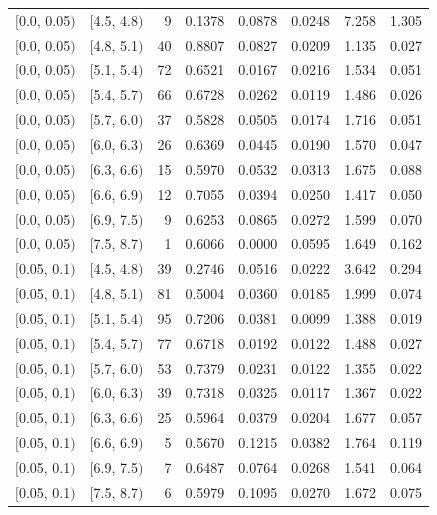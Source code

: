 \documentclass[11pt]{article}
\begin{document}
\begin{longtable}{| l | l | r | r | r | r | r | r |}
        $[$0.0, 0.05$)$ & $[$4.5, 4.8$)$ & 9 & 0.1378 & 0.0878 & 0.0248 & 7.258 & 1.305 \\
        $[$0.0, 0.05$)$ & $[$4.8, 5.1$)$ & 40 & 0.8807 & 0.0827 & 0.0209 & 1.135 & 0.027 \\
        $[$0.0, 0.05$)$ & $[$5.1, 5.4$)$ & 72 & 0.6521 & 0.0167 & 0.0216 & 1.534 & 0.051 \\
        $[$0.0, 0.05$)$ & $[$5.4, 5.7$)$ & 66 & 0.6728 & 0.0262 & 0.0119 & 1.486 & 0.026 \\
        $[$0.0, 0.05$)$ & $[$5.7, 6.0$)$ & 37 & 0.5828 & 0.0505 & 0.0174 & 1.716 & 0.051 \\
        $[$0.0, 0.05$)$ & $[$6.0, 6.3$)$ & 26 & 0.6369 & 0.0445 & 0.0190 & 1.570 & 0.047 \\
        $[$0.0, 0.05$)$ & $[$6.3, 6.6$)$ & 15 & 0.5970 & 0.0532 & 0.0313 & 1.675 & 0.088 \\
        $[$0.0, 0.05$)$ & $[$6.6, 6.9$)$ & 12 & 0.7055 & 0.0394 & 0.0250 & 1.417 & 0.050 \\
        $[$0.0, 0.05$)$ & $[$6.9, 7.5$)$ & 9 & 0.6253 & 0.0865 & 0.0272 & 1.599 & 0.070 \\
        $[$0.0, 0.05$)$ & $[$7.5, 8.7$)$ & 1 & 0.6066 & 0.0000 & 0.0595 & 1.649 & 0.162 \\
        $[$0.05, 0.1$)$ & $[$4.5, 4.8$)$ & 39 & 0.2746 & 0.0516 & 0.0222 & 3.642 & 0.294 \\
        $[$0.05, 0.1$)$ & $[$4.8, 5.1$)$ & 81 & 0.5004 & 0.0360 & 0.0185 & 1.999 & 0.074 \\
        $[$0.05, 0.1$)$ & $[$5.1, 5.4$)$ & 95 & 0.7206 & 0.0381 & 0.0099 & 1.388 & 0.019 \\
        $[$0.05, 0.1$)$ & $[$5.4, 5.7$)$ & 77 & 0.6718 & 0.0192 & 0.0122 & 1.488 & 0.027 \\
        $[$0.05, 0.1$)$ & $[$5.7, 6.0$)$ & 53 & 0.7379 & 0.0231 & 0.0122 & 1.355 & 0.022 \\
        $[$0.05, 0.1$)$ & $[$6.0, 6.3$)$ & 39 & 0.7318 & 0.0325 & 0.0117 & 1.367 & 0.022 \\
        $[$0.05, 0.1$)$ & $[$6.3, 6.6$)$ & 25 & 0.5964 & 0.0379 & 0.0204 & 1.677 & 0.057 \\
        $[$0.05, 0.1$)$ & $[$6.6, 6.9$)$ & 5 & 0.5670 & 0.1215 & 0.0382 & 1.764 & 0.119 \\
        $[$0.05, 0.1$)$ & $[$6.9, 7.5$)$ & 7 & 0.6487 & 0.0764 & 0.0268 & 1.541 & 0.064 \\
        $[$0.05, 0.1$)$ & $[$7.5, 8.7$)$ & 6 & 0.5979 & 0.1095 & 0.0270 & 1.672 & 0.075 \\

\end{longtable}
\end{document}

